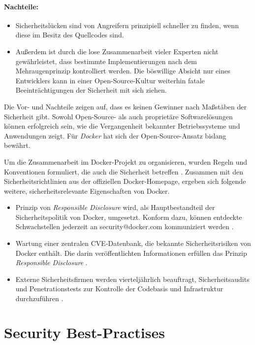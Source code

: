 \documentclass[../main.tex]{subfiles}
\begin{document}
    \paragraph{Nachteile:}
    \begin{itemize}
      \item Sicherheitslücken sind von Angreifern prinzipiell schneller zu finden, wenn diese im Besitz des Quellcodes sind.
      \item Außerdem ist durch die lose Zusammenarbeit vieler Experten nicht gewährleistet, dass bestimmte Implementierungen nach dem Mehraugenprinzip kontrolliert werden. Die böswillige Absicht nur eines Entwicklers kann in einer Open-Source-Kultur weiterhin fatale Be\-ein\-träch\-ti\-gung\-en der Sicherheit mit sich ziehen.
    \end{itemize}

    Die Vor- und Nachteile zeigen auf, dass es keinen Gewinner nach Maßstäben der Sicherheit gibt. Sowohl Open-Source- als auch proprietäre Softwarelösungen können erfolgreich sein, wie die Vergangenheit bekannter Betriebssysteme und Anwendungen zeigt. Für \emph{Docker} hat sich der Open-Source-Ansatz bislang bewährt.

    Um die Zusammenarbeit im Docker-Projekt zu organisieren, wurden Regeln und Konventionen formuliert, die auch die Sicherheit betreffen \cite{githubDockerContribution}. Zusammen mit den Sicherheitsrichtlinien aus der offiziellen Docker-Homepage, ergeben sich folgende weitere, sicherheitsrelevante Eigenschaften von Docker.

    \begin{itemize}
      \item Prinzip von \emph{Responsible Disclosure} wird, als Hauptbestandteil der Sicherheitspolitik von Docker, umgesetzt. Konform dazu, können entdeckte Schwachstellen jederzeit an security@docker.com kommuniziert werden \cite{dockerSecurityPortal}.
      \item Wartung einer zentralen \acrshort{CVE}-Datenbank, die bekannte Sicherheitsrisiken von Docker enthält. Die darin veröffentlichten Informationen erfüllen das Prinzip \emph{Responsible Disclosure} \cite{dockerCVEList}.
      \item Externe Sicherheitsfirmen werden vierteljährlich beauftragt, Sicherheitsaudits und Penetrationstests zur Kontrolle der Codebasis und Infrastruktur durchzuführen \cite[S.5]{dockerSecIntro}.
    \end{itemize}

  \section{Security Best-Practises}
\end{document}
